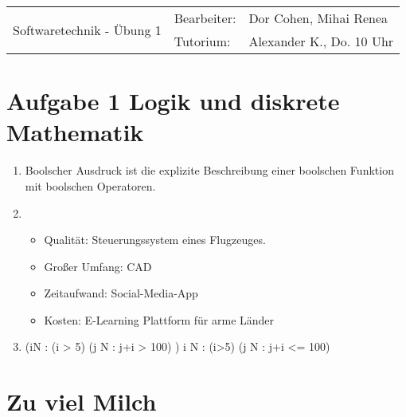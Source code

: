 \documentclass[paper=a4, english, ngerman]{scrartcl}
\begin{document}
	\begin{tabular}{p{8.5cm}ll}
		\multirow{2}{*}{\huge{Softwaretechnik - Übung 1} } & Bearbeiter: &  Dor Cohen, Mihai Renea \\
		                                 & Tutorium:   & Alexander K., Do. 10 Uhr         \\ \hline
	\end{tabular}
	
\section{Aufgabe 1 Logik und diskrete Mathematik}

	\begin{enumerate}[label=\alph*)]
		\item Boolscher Ausdruck ist die explizite Beschreibung einer boolschen Funktion mit boolschen Operatoren.
		\item \begin{itemize}
			\item Qualität: Steuerungssystem eines Flugzeuges.
			\item Großer Umfang: CAD
			\item Zeitaufwand: Social-Media-App
			\item Kosten: E-Learning Plattform für arme Länder
		\end{itemize}
		
		\item \neg (\forall i\in N : (i > 5) \Rightarrow (\exists j \in N : j+i > 100) ) \Longleftrightarrow
		\exists i \in N : (i>5) \Rightarrow (\forall j \in N : j+i <= 100)
		
		
	\end{enumerate}

\section{Zu viel Milch}
\end{document}
